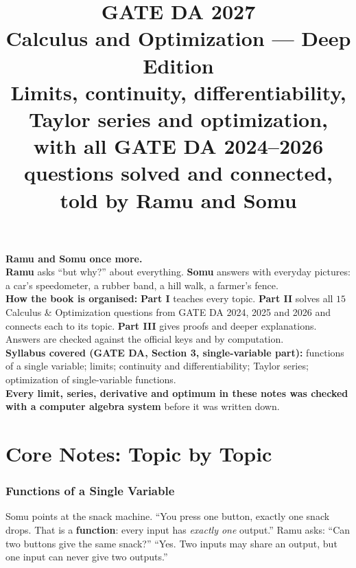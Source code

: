 \documentclass[11pt,a4paper]{article}
\title{\Huge\bfseries GATE DA 2027\\[4pt] \Large Calculus and Optimization --- Deep Edition\\[8pt]
\large Limits, continuity, differentiability, Taylor series and optimization,\\ with all GATE DA 2024--2026 questions solved and connected,\\ told by Ramu and Somu}
\author{}
\date{}
\begin{document}
\maketitle
\thispagestyle{empty}

\begin{center}
\begin{tcolorbox}[colback=yellow!10,colframe=orange!80!black,width=0.9\textwidth,breakable]
\textbf{Ramu and Somu once more.}\\
\textbf{Ramu} asks ``but why?'' about everything. \textbf{Somu} answers with everyday pictures: a car's speedometer, a rubber band, a hill walk, a farmer's fence.\\[4pt]
\textbf{How the book is organised:} \textbf{Part I} teaches every topic. \textbf{Part II} solves all $15$ Calculus \& Optimization questions from GATE DA 2024, 2025 and 2026 and connects each to its topic. \textbf{Part III} gives proofs and deeper explanations. Answers are checked against the official keys and by computation.\\[4pt]
\textbf{Syllabus covered (GATE DA, Section 3, single-variable part):} functions of a single variable; limits; continuity and differentiability; Taylor series; optimization of single-variable functions.\\[4pt]
\textbf{Every limit, series, derivative and optimum in these notes was checked with a computer algebra system} before it was written down.
\end{tcolorbox}
\end{center}

\tableofcontents
\newpage

\part{Core Notes: Topic by Topic}
\section{Functions of a Single Variable}

\begin{story}
Somu points at the snack machine. ``You press one button, exactly one snack drops. That is a \textbf{function}: every input has \emph{exactly one} output.'' Ramu asks: ``Can two buttons give the same snack?'' ``Yes. Two inputs may share an output, but one input can never give two outputs.''
\end{story}
\end{document}
